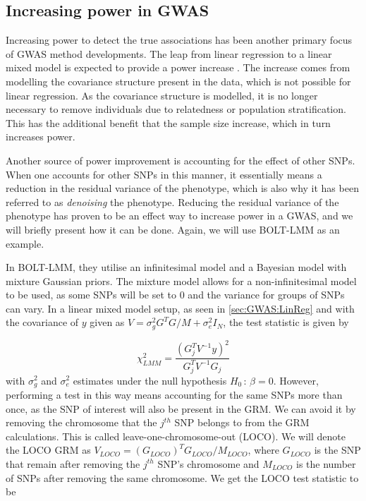 \subsection{Increasing power in GWAS}

Increasing power to detect the true associations has been another primary focus of GWAS method developments. The leap from linear regression to a linear mixed model is expected to provide a power increase \cite{loh2015efficient}. The increase comes from modelling the covariance structure present in the data, which is not possible for linear regression. As the covariance structure is modelled, it is no longer necessary to remove individuals due to relatedness or population stratification. This has the additional benefit that the sample size increase, which in turn increases power. 

Another source of power improvement is accounting for the effect of other SNPs. When one accounts for other SNPs in this manner, it essentially means a reduction in the residual variance of the phenotype, which is also why it has been referred to as \textit{denoising} the phenotype\cite{aschard2015adjusting}. Reducing the residual variance of the phenotype has proven to be an effect way to increase power in a GWAS, and we will briefly present how it can be done. Again, we will use BOLT-LMM as an example.

In BOLT-LMM, they utilise an infinitesimal model and a Bayesian model with mixture Gaussian priors. The mixture model allows for a non-infinitesimal model to be used, as some SNPs will be set to $ 0 $ and the variance for groups of SNPs can vary.  In a linear mixed model setup, as seen in \cref{sec:GWAS:LinReg} and with the covariance of $ y $ given as $V = \sigma_g^2G^TG/M + \sigma_e^2I_N $, the test statistic is given by

\begin{equation}\label{eq:boltLMMchisq}
\chi^2_{LMM} = \dfrac{(G_j^TV^{-1}y)^2}{G_j^TV^{-1}G_j}
\end{equation}
with $ \sigma_g^2 $ and $ \sigma_e^2 $ estimates under the null hypothesis $ H_0{\,:\,} \beta = 0 $. However, performing a test in this way means accounting for the same SNPs more than once, as the SNP of interest will also be present in the GRM. We can avoid it by removing the chromosome that the $ j^{th} $ SNP belongs to from the GRM calculations. This is called leave-one-chromosome-out (LOCO). We will denote the LOCO GRM as $ V_{LOCO} = (G_{LOCO})^TG_{LOCO}/M_{LOCO}$, where $ G_{LOCO} $ is the SNP that remain after removing the $ j^{th} $ SNP's chromosome and $ M_{LOCO} $ is the number of SNPs after removing the same chromosome. We get the LOCO test statistic to be

